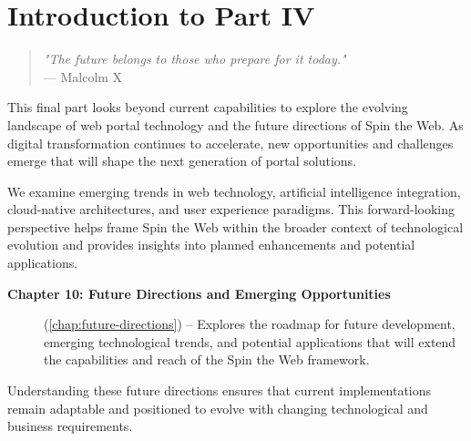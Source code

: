 
\chapter*{Introduction to Part IV}
\label{part:future}

\begin{quote}
\textit{"The future belongs to those who prepare for it today."} \\
— Malcolm X
\end{quote}

This final part looks beyond current capabilities to explore the evolving landscape of web portal technology and the future directions of Spin the Web. As digital transformation continues to accelerate, new opportunities and challenges emerge that will shape the next generation of portal solutions.

We examine emerging trends in web technology, artificial intelligence integration, cloud-native architectures, and user experience paradigms. This forward-looking perspective helps frame Spin the Web within the broader context of technological evolution and provides insights into planned enhancements and potential applications.

\begin{description}
\item[\textbf{Chapter 10: Future Directions and Emerging Opportunities}] (\cref{chap:future-directions}) -- Explores the roadmap for future development, emerging technological trends, and potential applications that will extend the capabilities and reach of the Spin the Web framework.
\end{description}

Understanding these future directions ensures that current implementations remain adaptable and positioned to evolve with changing technological and business requirements.
